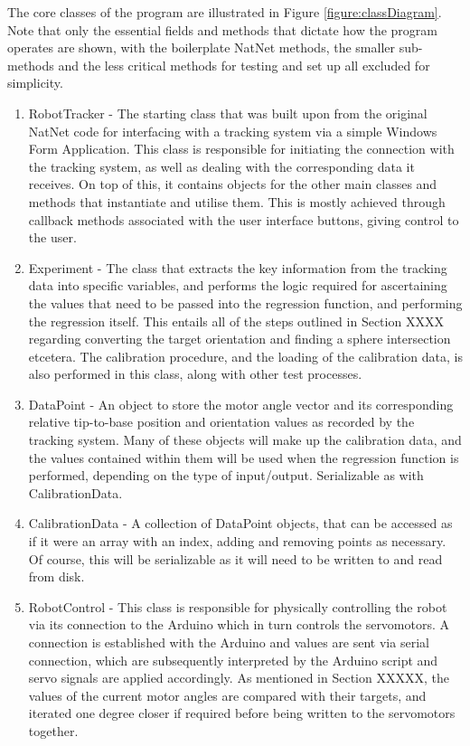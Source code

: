 \documentclass[11pt]{article}
\begin{document}
The core classes of the program are illustrated in Figure \ref{figure:classDiagram}. Note that only the essential fields and methods that dictate how the program operates are shown, with the boilerplate NatNet methods, the smaller sub-methods and the less critical methods for testing and set up all excluded for simplicity.
\begin{enumerate}
\item{RobotTracker - The starting class that was built upon from the original NatNet code for interfacing with a tracking system via a simple Windows Form Application. This class is responsible for initiating the connection with the tracking system, as well as dealing with the corresponding data it receives. On top of this, it contains objects for the other main classes and methods that instantiate and utilise them. This is mostly achieved through callback methods associated with the user interface buttons, giving control to the user.}
\item{Experiment - The class that extracts the key information from the tracking data into specific variables, and performs the logic required for ascertaining the values that need to be passed into the regression function, and performing the regression itself. This entails all of the steps outlined in Section XXXX regarding converting the target orientation and finding a sphere intersection etcetera. The calibration procedure, and the loading of the calibration data, is also performed in this class, along with other test processes.}
\item{DataPoint - An object to store the motor angle vector and its corresponding relative tip-to-base position and orientation values as recorded by the tracking system. Many of these objects will make up the calibration data, and the values contained within them will be used when the regression function is performed, depending on the type of input/output. Serializable as with CalibrationData.}
\item{CalibrationData - A collection of DataPoint objects, that can be accessed as if it were an array with an index, adding and removing points as necessary. Of course, this will be serializable as it will need to be written to and read from disk.}
\item{RobotControl - This class is responsible for physically controlling the robot via its connection to the Arduino which in turn controls the servomotors. A connection is established with the Arduino and values are sent via serial connection, which are subsequently interpreted by the Arduino script and servo signals are applied accordingly. As mentioned in Section XXXXX, the values of the current motor angles are compared with their targets, and iterated one degree closer if required before being written to the servomotors together.}
\end{enumerate}
\end{document}
